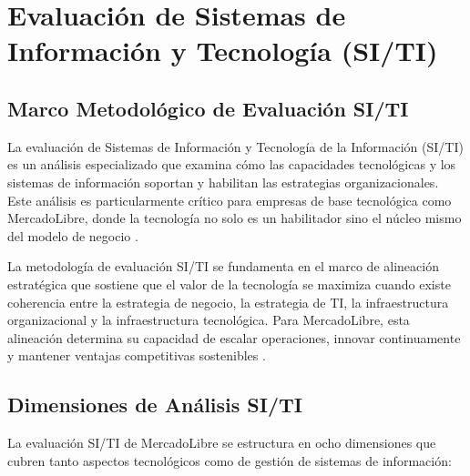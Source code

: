 \section{Evaluación de Sistemas de Información y Tecnología (SI/TI)}
\label{sec:evaluacion_siti}

\subsection{Marco Metodológico de Evaluación SI/TI}

La evaluación de Sistemas de Información y Tecnología de la Información (SI/TI) es un análisis especializado que examina cómo las capacidades tecnológicas y los sistemas de información soportan y habilitan las estrategias organizacionales. Este análisis es particularmente crítico para empresas de base tecnológica como MercadoLibre, donde la tecnología no solo es un habilitador sino el núcleo mismo del modelo de negocio \autocite{porter1985}.

La metodología de evaluación SI/TI se fundamenta en el marco de alineación estratégica que sostiene que el valor de la tecnología se maximiza cuando existe coherencia entre la estrategia de negocio, la estrategia de TI, la infraestructura organizacional y la infraestructura tecnológica. Para MercadoLibre, esta alineación determina su capacidad de escalar operaciones, innovar continuamente y mantener ventajas competitivas sostenibles \autocite{teece2007}.

\subsection{Dimensiones de Análisis SI/TI}

La evaluación SI/TI de MercadoLibre se estructura en ocho dimensiones que cubren tanto aspectos tecnológicos como de gestión de sistemas de información:

